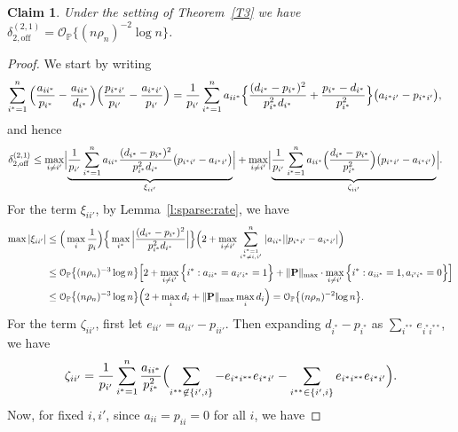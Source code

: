 \documentclass[10pt,journal,compsoc]{IEEEtran}
\newcommand{\op}{\mathcal{O}_{\mathbb{P}}}
\newcommand{\ee}{\end{aligned} \end{equation}}
\newtheorem{claim}{Claim}
\newcommand{\BL}{\Big (}
\newcommand{\BR}{\Big )}
\newcommand{\bee}{\begin{equation}\begin{aligned}}
\numberwithin{equation}{section}
\begin{document}
\begin{claim} Under the setting of Theorem~\ref{T3} we have $\delta^{(2,1)}_{2,\text{off}} =
  \op\big\{(n\rho_n)^{-2}{\log n}\big\}$.
  \end{claim}
  \begin{proof}
We start by writing
\begin{equation}
  \begin{split}
\sum_{i^* = 1}^n\BL\frac{a_{ii^*}}{p_{i^*}} - \frac{a_{ii^*}}{d_{i^*}}
\BR\BL\frac{p_{i^*i'}}{p_{i'}} - \frac{a_{i^{*}{i'}}}{p_{i'}} \BR 
&=
\frac{1}{p_{i'}}\sum_{i^* = 1}^na_{ii^*} \Bigl\{\frac{(d_{i^*} -
  p_{i^*})^2}{p_{i^*}^2 d_{i^*}} + \frac{p_{i^*} -
  d_{i^*}}{p_{i^*}^2}\Bigr\} \bigl(a_{i^*i'} - p_{i^*i'}\bigr),
\end{split}
\end{equation}
and hence
\bee
\delta_{2,\text{off}}^{(2,1)}
&\leq \max_{i\neq i'}\Bigl|\underbrace{\frac{1}{p_{i'}}\sum_{i^* = 1}^na_{ii^*}\frac{(d_{i^*} - p_{i^*})^2}{p_{i^*}^2d_{i^*}}
  \big(p_{i^*i'} - a_{i^*i'}\big)}_{\xi_{ii'}}\Bigr| 
+ \max_{i\neq i'}\Bigl|\underbrace{\frac{1}{p_{i'}}\sum_{i^* = 1}^na_{ii^*}\BL\frac{d_{i^*} - p_{i^*}}{p_{i^*}^2}
\BR\big(p_{i^*i'} - a_{i^*i'}\big)}_{\zeta_{ii'}}\Bigr|.
\ee
For the term $\xi_{ii'}$, by Lemma~\ref{l:sparse:rate}, we have
\begin{equation*}
\begin{split}
 \max |\xi_{ii'}| 
 & \leq \Big(\max_i\frac{1}{p_i}\Big)
  \Big\{\max_{i^*}\Big|\frac{(d_{i^*} -
    p_{i^*})^2}{p_{i^*}^2d_{i^*}}\Big|\Big\}
    \Big(2 + \max_{i\neq
    i'}\sum_{i^* = 1\atop i^* \neq i,i'}^n|a_{ii^*}||p_{i^*i'} -
  a_{i^*i'}| \Big)
  \\ &\leq \op\big\{(n\rho_n)^{-3} \log n\big\} 
  \Bigl[2 +
  \max_{i\neq i'}\Big\{i^*:a_{ii^*} = a_{i'i^*} = 1\Big\}
   +
  \|\mathbf{P}\|_{\max} \cdot \max_{i\neq i'}\Big\{i^*:a_{ii^*} = 1, a_{i'i^*} = 0\Big\} \Bigr]
  \\ & \leq \op\big\{(n\rho_n)^{-3} \log n\big\}  \Bigl(2 + \max_{i} d_i +
  \|\mathbf{P}\|_{\max}  \max_{i} d_i \Bigr)
= \op\big\{(n\rho_n)^{-2}{\log n}\big\}.
  \end{split}
\end{equation*}
For the term $\zeta_{ii'}$, first let $e_{ii'} = a_{ii'} -
p_{ii'}$. Then expanding $d_{i^{*}} - p_{i^{*}}$ as $\sum_{i^{**}}
e_{i^*i^{**}}$, we have
\bee
\zeta_{ii'} =\frac{1}{p_{i'}}\sum_{i^* = 1}^n
\frac{a_{ii^*}}{p_{i^*}^2}\Bigl(\sum_{i^{**}\not \in \{i',i\}} -
e_{i^*i^{**}} e_{i^*i'} - \sum_{i^{**} \in \{i',i\}}e_{i^*i^{**}}e_{i^*i'}\Bigr).
\ee
Now, for fixed $i,i'$, since $a_{ii} = p_{ii} = 0$ for all $i$, we have

\end{proof}
\end{document}
